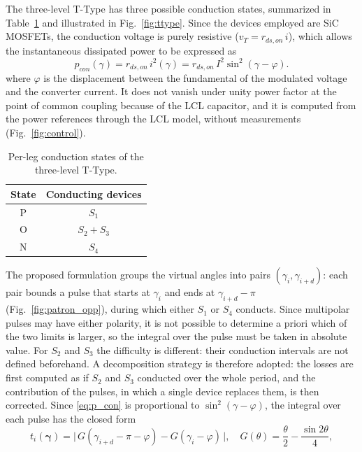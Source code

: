 \documentclass[conference]{IEEEtran}
\newcommand{\gv}{\boldsymbol{\gamma}}
\begin{document}
The three-level T-Type has three possible conduction states, summarized in
Table~\ref{tab:estados_cond} and illustrated in Fig.~\ref{fig:ttype}. Since the
devices employed are SiC MOSFETs, the conduction voltage is purely resistive
($v_T = r_{ds,on}\,i$), which allows the instantaneous dissipated power to be
expressed as
\begin{equation}
    p_{con}(\gamma) = r_{ds,on}\,i^2(\gamma)
                    = r_{ds,on}\,I^2\sin^2(\gamma-\varphi).
    \label{eq:p_con}
\end{equation}
where $\varphi$ is the displacement between the fundamental of the
modulated voltage and the converter current. It does not vanish under unity
power factor at the point of common coupling because of the LCL capacitor,
and it is computed from the power references through the LCL model,
without measurements (Fig.~\ref{fig:control}).
\begin{table}[!t]
    \centering
    \caption{Per-leg conduction states of the three-level T-Type.}
    \bgroup
    \def\arraystretch{1.0}
    \begin{tabular}{c c}         \toprule
            \rowcolor{Gray}
        State & Conducting devices \\ \midrule
        P & $S_1$ \\
        O & $S_2 + S_3$ \\
        N & $S_4$ \\
        \bottomrule
    \end{tabular}
    \egroup
    \label{tab:estados_cond}
\end{table}
The proposed formulation groups the virtual angles into pairs
$(\gamma_i,\gamma_{i+d})$: each pair bounds a pulse that starts at $\gamma_i$
and ends at $\gamma_{i+d}-\pi$ (Fig.~\ref{fig:patron_opp}), during which
either $S_1$ or $S_4$ conducts. Since multipolar pulses may have either
polarity, it is not possible to determine a priori which of the two limits is
larger, so the integral over the pulse must be taken in absolute value. For
$S_2$ and $S_3$ the difficulty is different: their conduction intervals are
not defined beforehand. A decomposition strategy is therefore adopted: the
losses are first computed as if $S_2$ and $S_3$ conducted over the whole
period, and the contribution of the pulses, in which a single device replaces
them, is then corrected. Since \eqref{eq:p_con} is proportional to
$\sin^2(\gamma-\varphi)$, the integral over each pulse has the closed form
\begin{equation}
    t_i(\gv) = \big|\,G(\gamma_{i+d}-\pi-\varphi) - G(\gamma_i-\varphi)\,\big|,
    \quad G(\theta) = \frac{\theta}{2}-\frac{\sin 2\theta}{4},
    \label{eq:t_i}
\end{equation}
\end{document}
